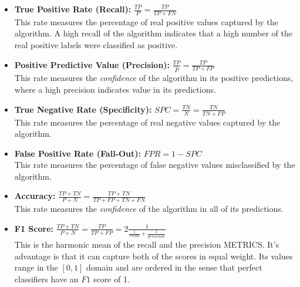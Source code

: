 \begin{itemize}
\item \textbf{True Positive Rate (Recall):} $\frac{TP}{P} = \frac{TP}{TP + FN}$ \\ This rate measures the percentage of real positive values captured by the algorithm. A high recall of the algorithm indicates that a high number of the real positive labels were classified as positive.


\item \textbf{Positive Predictive Value (Precision):} $\frac{TP}{\hat{P}} = \frac{TP}{TP + FP}$ \\ This rate measures the \textit{confidence} of the algorithm in its positive predictions, where a high precision indicates value in its predictions.

\item \textbf{True Negative Rate (Specificity):} $ SPC = \frac{TN}{N} = \frac{TN}{TN + FP}$ \\ This rate measures the percentage of real negative values captured by the algorithm.


\item \textbf{False Positive Rate (Fall-Out):} $FPR = 1 - SPC$ \\ This rate measures the percentage of false negative values misclassified by the algorithm.

\item \textbf{Accuracy:} $\frac{TP + TN}{P + N} = \frac{TP + TN}{TP + FP + TN + FN}$ \\ This rate measures the \textit{confidence} of the algorithm in all of its predictions.

%
\item \textbf{F1 Score:} $\frac{TP + TN}{P + N} = \frac{TP}{TP + FP} = 2 \frac{1}{ \frac{1}{recall} + \frac{1}{precision} }$ \\ This is the harmonic mean of the recall and the precision METRICS. It's advantage is that it can capture both of the scores in equal weight. Its values range in the $[0,1 ]$ domain and are ordered in the sense that perfect classifiers have an $F1$ score of 1.

\end{itemize}


